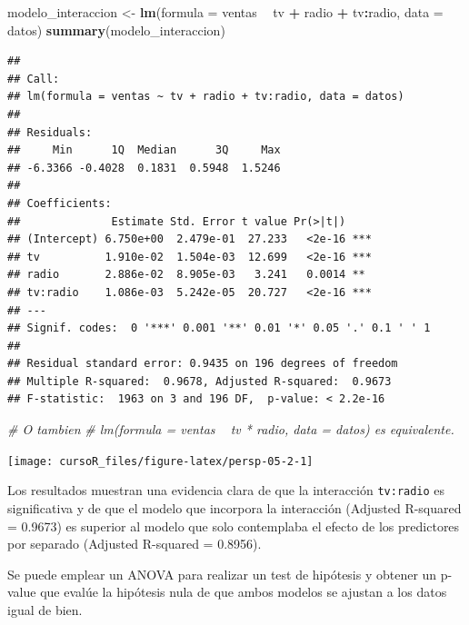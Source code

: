 \documentclass[]{book}
\newenvironment{Shaded}{\begin{snugshade}}{\end{snugshade}}
\newcommand{\KeywordTok}[1]{\textcolor[rgb]{0.13,0.29,0.53}{\textbf{#1}}}
\newcommand{\DataTypeTok}[1]{\textcolor[rgb]{0.13,0.29,0.53}{#1}}
\newcommand{\StringTok}[1]{\textcolor[rgb]{0.31,0.60,0.02}{#1}}
\newcommand{\CommentTok}[1]{\textcolor[rgb]{0.56,0.35,0.01}{\textit{#1}}}
\newcommand{\OperatorTok}[1]{\textcolor[rgb]{0.81,0.36,0.00}{\textbf{#1}}}
\newcommand{\NormalTok}[1]{#1}
\begin{document}
\begin{Shaded}
\begin{Highlighting}[]
\NormalTok{modelo_interaccion <-}\StringTok{ }\KeywordTok{lm}\NormalTok{(}\DataTypeTok{formula =}\NormalTok{ ventas }\OperatorTok{~}\StringTok{ }\NormalTok{tv }\OperatorTok{+}\StringTok{ }\NormalTok{radio }\OperatorTok{+}\StringTok{ }\NormalTok{tv}\OperatorTok{:}\NormalTok{radio, }\DataTypeTok{data =}\NormalTok{ datos)}
\KeywordTok{summary}\NormalTok{(modelo_interaccion)}
\end{Highlighting}
\end{Shaded}

\begin{verbatim}
## 
## Call:
## lm(formula = ventas ~ tv + radio + tv:radio, data = datos)
## 
## Residuals:
##     Min      1Q  Median      3Q     Max 
## -6.3366 -0.4028  0.1831  0.5948  1.5246 
## 
## Coefficients:
##              Estimate Std. Error t value Pr(>|t|)    
## (Intercept) 6.750e+00  2.479e-01  27.233   <2e-16 ***
## tv          1.910e-02  1.504e-03  12.699   <2e-16 ***
## radio       2.886e-02  8.905e-03   3.241   0.0014 ** 
## tv:radio    1.086e-03  5.242e-05  20.727   <2e-16 ***
## ---
## Signif. codes:  0 '***' 0.001 '**' 0.01 '*' 0.05 '.' 0.1 ' ' 1
## 
## Residual standard error: 0.9435 on 196 degrees of freedom
## Multiple R-squared:  0.9678, Adjusted R-squared:  0.9673 
## F-statistic:  1963 on 3 and 196 DF,  p-value: < 2.2e-16
\end{verbatim}

\begin{Shaded}
\begin{Highlighting}[]
\CommentTok{# O tambien}
\CommentTok{# lm(formula = ventas ~ tv * radio, data = datos) es equivalente.}
\end{Highlighting}
\end{Shaded}

\begin{center}\texttt{[image: cursoR\_files/figure-latex/persp-05-2-1]} \end{center}

Los resultados muestran una evidencia clara de que la interacción
\texttt{tv:radio} es significativa y de que el modelo que incorpora la
interacción (Adjusted R-squared = 0.9673) es superior al modelo que solo
contemplaba el efecto de los predictores por separado (Adjusted
R-squared = 0.8956).

Se puede emplear un ANOVA para realizar un test de hipótesis y obtener
un p-value que evalúe la hipótesis nula de que ambos modelos se ajustan
a los datos igual de bien.
\end{document}
